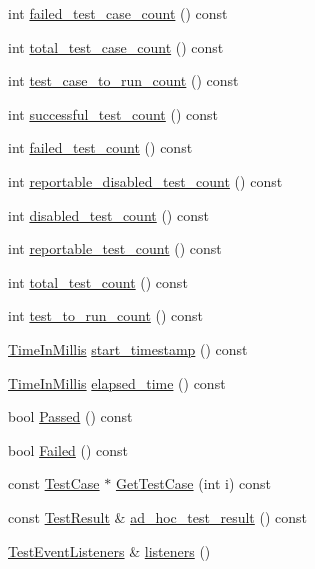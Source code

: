 \begin{DoxyCompactItemize}
\item 
int \mbox{\hyperlink{classtesting_1_1UnitTest_abc0fa297a4103f7cdd9627ae27d9d0ef}{failed\+\_\+test\+\_\+case\+\_\+count}} () const
\item 
int \mbox{\hyperlink{classtesting_1_1UnitTest_a93fc8f4eebc3212d06468ad216830ced}{total\+\_\+test\+\_\+case\+\_\+count}} () const
\item 
int \mbox{\hyperlink{classtesting_1_1UnitTest_a965248fbe72f9fede5de921b6666943b}{test\+\_\+case\+\_\+to\+\_\+run\+\_\+count}} () const
\item 
int \mbox{\hyperlink{classtesting_1_1UnitTest_a49ee8056e357ad497e67399447dd5a40}{successful\+\_\+test\+\_\+count}} () const
\item 
int \mbox{\hyperlink{classtesting_1_1UnitTest_ace1c860482b4ae5c341df5a9665e5c08}{failed\+\_\+test\+\_\+count}} () const
\item 
int \mbox{\hyperlink{classtesting_1_1UnitTest_a2a2835db178d5c8569507db9f0a3d54f}{reportable\+\_\+disabled\+\_\+test\+\_\+count}} () const
\item 
int \mbox{\hyperlink{classtesting_1_1UnitTest_ad69ccf3d4a9bc7333badeafbde3bc76b}{disabled\+\_\+test\+\_\+count}} () const
\item 
int \mbox{\hyperlink{classtesting_1_1UnitTest_a449d0e0350ef146040cd37679c005248}{reportable\+\_\+test\+\_\+count}} () const
\item 
int \mbox{\hyperlink{classtesting_1_1UnitTest_af6e02fcf76fd7247687f4e8af6e7ef41}{total\+\_\+test\+\_\+count}} () const
\item 
int \mbox{\hyperlink{classtesting_1_1UnitTest_a461f46b2976f135d2a65e8d3def746e9}{test\+\_\+to\+\_\+run\+\_\+count}} () const
\item 
\mbox{\hyperlink{namespacetesting_a992de1d091ce660f451d1e8b3ce30fd6}{Time\+In\+Millis}} \mbox{\hyperlink{classtesting_1_1UnitTest_a3d83fe1cc5570a1c34f9754b0f56d65f}{start\+\_\+timestamp}} () const
\item 
\mbox{\hyperlink{namespacetesting_a992de1d091ce660f451d1e8b3ce30fd6}{Time\+In\+Millis}} \mbox{\hyperlink{classtesting_1_1UnitTest_acf608411a17cb3b40a1e9d724f262b3b}{elapsed\+\_\+time}} () const
\item 
bool \mbox{\hyperlink{classtesting_1_1UnitTest_a7c9b327bc14cb8a282c789dc6513a55b}{Passed}} () const
\item 
bool \mbox{\hyperlink{classtesting_1_1UnitTest_a706f29e765916616b11a271a65948727}{Failed}} () const
\item 
const \mbox{\hyperlink{classtesting_1_1TestCase}{Test\+Case}} $\ast$ \mbox{\hyperlink{classtesting_1_1UnitTest_a724d4c8be4481e0c1523a22b72dc7dac}{Get\+Test\+Case}} (int i) const
\item 
const \mbox{\hyperlink{classtesting_1_1TestResult}{Test\+Result}} \& \mbox{\hyperlink{classtesting_1_1UnitTest_aa59dde4c3dc43a920ed142a27670686c}{ad\+\_\+hoc\+\_\+test\+\_\+result}} () const
\item 
\mbox{\hyperlink{classtesting_1_1TestEventListeners}{Test\+Event\+Listeners}} \& \mbox{\hyperlink{classtesting_1_1UnitTest_aac10085cf7c0d1751306db10cdd953cb}{listeners}} ()
\end{DoxyCompactItemize}
